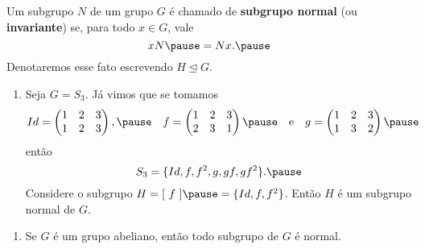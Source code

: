 \documentclass{beamer}
\begin{document}
    \begin{frame}
        \begin{definicao}
            Um subgrupo $N$ \pause de um grupo $G$ \pause é chamado de \textbf{subgrupo normal} \pause (ou \textbf{invariante}) \pause se, para todo $x \in G$, \pause vale
            \[
                xN \pause = Nx. \pause
            \]
            Denotaremos esse fato escrevendo $H \unlhd G$.
        \end{definicao}
    \end{frame}

    \begin{frame}
        \begin{exemplos}
            \begin{enumerate}[label=({\arabic*})]
                \item Seja $G = S_3$. \pause Já vimos que se tomamos
                \[
                    Id = \begin{pmatrix}
                        1 & 2 & 3\\
                        1 & 2 & 3
                    \end{pmatrix}, \pause \quad
                    f = \begin{pmatrix}
                        1 & 2 & 3\\
                        2 & 3 & 1
                    \end{pmatrix} \pause \quad \mbox{e}\quad
                    g = \begin{pmatrix}
                        1 & 2 & 3\\
                        1 & 3 & 2
                    \end{pmatrix} \pause
                \]
                então
                \[
                    S_3 = \{Id, f, f^2, g, gf, gf^2\}. \pause
                \]
                Considere o subgrupo $H = [\ f\ ] \pause = \{Id, f, f^2\}$. \pause Então $H$ é um subgrupo normal de $G$.

                \seti
            \end{enumerate}
        \end{exemplos}
    \end{frame}

    \begin{frame}
        \begin{exemplos}
            \begin{enumerate}[label=({\arabic*})]
                \conti

                \item Se $G$ é um grupo abeliano, \pause então todo subgrupo de $G$ é normal.

                \seti
            \end{enumerate}
        \end{exemplos}
    \end{frame}
\end{document}
